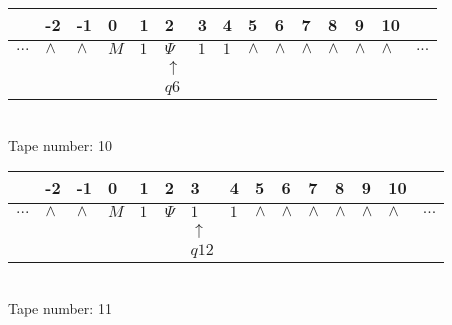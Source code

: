 \documentclass{article}
\begin{document}
\begin{table}[H]
\centering
\begin{tabular}{lllllllllllllll}
 & -2 & -1 & 0 & 1 & 2 & 3 & 4 & 5 & 6 & 7 & 8 & 9 & 10 & \\
\hline
$...$ & \multicolumn{1}{|l|}{$\wedge$} & \multicolumn{1}{|l|}{$\wedge$} & \multicolumn{1}{|l|}{$M$} & \multicolumn{1}{|l|}{$1$} & \multicolumn{1}{|l|}{$\Psi$} & \multicolumn{1}{|l|}{$1$} & \multicolumn{1}{|l|}{$1$} & \multicolumn{1}{|l|}{$\wedge$} & \multicolumn{1}{|l|}{$\wedge$} & \multicolumn{1}{|l|}{$\wedge$} & \multicolumn{1}{|l|}{$\wedge$} & \multicolumn{1}{|l|}{$\wedge$} & \multicolumn{1}{|l|}{$\wedge$} & $...$\\
\hline
&  &  &  &  & $\uparrow$ &  &  &  &  &  &  &  &  &  \\
&  &  &  &  & $ q6 $ &  &  &  &  &  &  &  &  &  \\
\end{tabular}
\\
Tape number: 10
\noindent\makebox[\linewidth]{\hdashrule{\textwidth}{1pt}{1pt}}\end{table}

\begin{table}[H]
\centering
\begin{tabular}{lllllllllllllll}
 & -2 & -1 & 0 & 1 & 2 & 3 & 4 & 5 & 6 & 7 & 8 & 9 & 10 & \\
\hline
$...$ & \multicolumn{1}{|l|}{$\wedge$} & \multicolumn{1}{|l|}{$\wedge$} & \multicolumn{1}{|l|}{$M$} & \multicolumn{1}{|l|}{$1$} & \multicolumn{1}{|l|}{$\Psi$} & \multicolumn{1}{|l|}{$1$} & \multicolumn{1}{|l|}{$1$} & \multicolumn{1}{|l|}{$\wedge$} & \multicolumn{1}{|l|}{$\wedge$} & \multicolumn{1}{|l|}{$\wedge$} & \multicolumn{1}{|l|}{$\wedge$} & \multicolumn{1}{|l|}{$\wedge$} & \multicolumn{1}{|l|}{$\wedge$} & $...$\\
\hline
&  &  &  &  &  & $\uparrow$ &  &  &  &  &  &  &  &  \\
&  &  &  &  &  & $ q12 $ &  &  &  &  &  &  &  &  \\
\end{tabular}
\\
Tape number: 11
\noindent\makebox[\linewidth]{\hdashrule{\textwidth}{1pt}{1pt}}\end{table}
\end{document}
